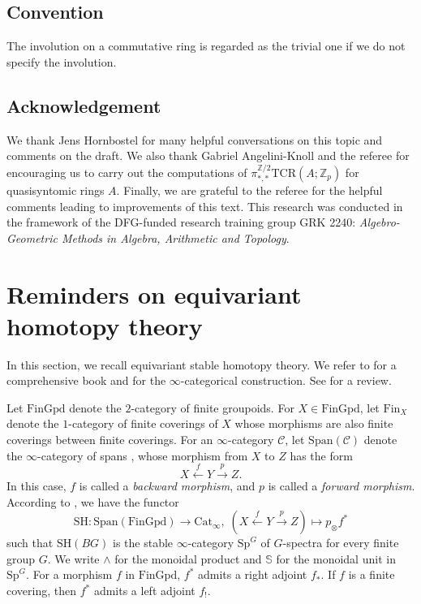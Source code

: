 \documentclass[10pt]{amsart}
\theoremstyle{definition}
\numberwithin{equation}{section}
\newcommand{\Sphere}{\mathbb{S}}
\newcommand{\Z}{\mathbb{Z}}
\newcommand{\cC}{\mathcal{C}}
\newcommand{\Sp}{\mathrm{Sp}}
\newcommand{\Fin}{\mathrm{Fin}}
\newcommand{\Span}{\mathrm{Span}}
\newcommand{\Cat}{\mathrm{Cat}}
\newcommand{\FinGpd}{\mathrm{FinGpd}}
\newcommand{\SH}{\mathrm{SH}}
\newcommand{\TCR}{\mathrm{TCR}}
\begin{document}
\medskip




\subsection*{Convention} The involution on a commutative ring is regarded as the trivial one if we do not specify the involution.

\medskip


\subsection*{Acknowledgement} We thank Jens Hornbostel for many helpful conversations on this topic and comments on the draft.
We also thank Gabriel Angelini-Knoll and the referee for encouraging us to carry out the computations of $\pi_{*,*}^{\Z/2}\TCR(A;\Z_p)$ for quasisyntomic rings $A$.
Finally,
we are grateful to the referee for the helpful comments leading to improvements of this text.
This research was conducted in the framework of the DFG-funded research training group GRK 2240: \emph{Algebro-Geometric Methods in Algebra,
Arithmetic and Topology}.


\section{Reminders on equivariant homotopy theory}

In this section,
we recall equivariant stable homotopy theory.
We refer to \cite{HHR21} for a comprehensive book and \cite[\S 9]{BH21} for the $\infty$-categorical construction.
See  \cite[\S A]{HP23} for a review.


Let $\FinGpd$ denote the $2$-category of finite groupoids.
For $X\in \FinGpd$,
let $\Fin_X$ denote the $1$-category of finite coverings of $X$ whose morphisms are also finite coverings between finite coverings.
For an $\infty$-category $\cC$,
let $\Span(\cC)$ denote the $\infty$-category of spans \cite[\S 5]{Bar17},
whose morphism from $X$ to $Z$ has the form
\[
X\xleftarrow{f} Y\xrightarrow{p}Z.
\]
In this case,
$f$ is called a \emph{backward morphism},
and $p$ is called a \emph{forward morphism}.
According to \cite[\S 9.2]{BH21},
we have the functor
\[
\SH \colon \Span(\FinGpd)\to \Cat_\infty,
\;
(X\xleftarrow{f}Y\xrightarrow{p}Z)\mapsto p_\otimes f^*
\]
such that $\SH (B G)$ is the stable $\infty$-category $\Sp^G$ of $G$-spectra for every finite group $G$.
We write $\wedge$ for the monoidal product and $\Sphere$ for the monoidal unit in $\Sp^G$.
For a morphism $f$ in $\FinGpd$,
$f^*$ admits a right adjoint $f_*$.
If $f$ is a finite covering,
then $f^*$ admits a left adjoint $f_!$.
\end{document}
